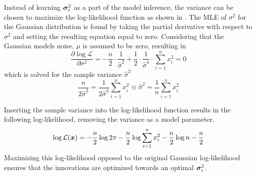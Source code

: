         Instead of learning $\bm{\sigma}_\epsilon^2$ as a part of the model inference, the variance can be chosen to maximize the log-likelihood function as shown in \cite{haerdle2015statistics}. The MLE of $\sigma^2$ for the Gaussian distribution is found by taking the partial derivative with respect to $\sigma^2$ and setting the resulting equation equal to zero. Considering that the Gaussian models noise, $\mu$ is assumed to be zero, resulting in
        \begin{equation}\label{error-sigma-partial}
            \frac{\partial\log\mathcal{L}}{\partial\sigma^2} = -\frac{n}{2} \cdot \frac{1}{\hat{\sigma}^2} + \frac{1}{2} \cdot \frac{1}{\hat{\sigma}^4} \cdot \sum_{i=1}^n x_i^2 = 0
        \end{equation}
        which is solved for the sample variance $\hat{\sigma}^2$
        \begin{equation}
            \frac{n}{2\hat{\sigma}^2} = \frac{1}{2\hat{\sigma}^4} \sum_{i=1}^n x_i^2 \equiv \hat{\sigma}^2 = \frac{1}{n} \sum_{i=1}^n x_i^2
        \end{equation}
        
        Inserting the sample variance into the log-likelihood function results in the following log-likelihood, removing the variance as a model parameter.
        \begin{equation}
            \log\mathcal{L}(\bm{x})=-\frac{n}{2}\log 2\pi -\frac{n}{2}\log\sum_{i=1}^n x_i^2-\frac{n}{2}\log n-\frac{n}{2}
        \end{equation}
        Maximizing this log-likelihood opposed to the original Gaussian log-likelihood ensures that the innovations are optimized towards an optimal $\bm{\sigma}_\epsilon^2$.
    
